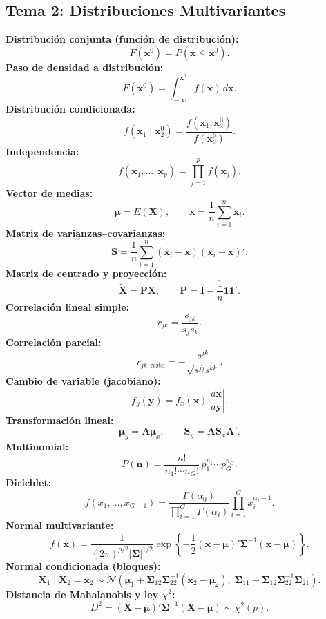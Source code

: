 \documentclass[12pt, a4paper]{article}
\theoremstyle{plain}
\theoremstyle{definition}
\theoremstyle{remark}
\newcommand{\mat}[1]{\mathbf{#1}}
\begin{document}
\subsection*{Tema 2: Distribuciones Multivariantes}
\begin{mdframed}[style=resultado]
\textbf{Distribución conjunta (función de distribución):}
\[
  F(\mathbf{x}^0)=P(\mathbf{x}\le \mathbf{x}^0).
\]
\textbf{Paso de densidad a distribución:}
\[
  F(\mathbf{x}^0)=\int_{-\infty}^{\mathbf{x}^0} f(\mathbf{x})\,d\mathbf{x}.
\]
\textbf{Distribución condicionada:}
\[
  f(\mathbf{x}_1\mid \mathbf{x}_2^0)=
  \frac{f(\mathbf{x}_1,\mathbf{x}_2^0)}{f(\mathbf{x}_2^0)}.
\]
\textbf{Independencia:}
\[
  f(\mathbf{x}_1,\dots,\mathbf{x}_p)=\prod_{j=1}^p f(\mathbf{x}_j).
\]
\textbf{Vector de medias:}
\[
  \boldsymbol{\mu}=E(\mathbf{X}),\qquad
  \bar{\mathbf{x}}=\frac{1}{n}\sum_{i=1}^n\mathbf{x}_i.
\]
\textbf{Matriz de varianzas--covarianzas:}
\[
  \mat{S}= \frac{1}{n}\sum_{i=1}^n (\mathbf{x}_i-\bar{\mathbf{x}})(\mathbf{x}_i-\bar{\mathbf{x}})'.
\]
\textbf{Matriz de centrado y proyección:}
\[
  \tilde{\mathbf{X}}=\mat{P}\mathbf{X},\qquad
  \mat{P}=\mat{I}-\frac{1}{n}\mathbf{1}\mathbf{1}'.
\]
\textbf{Correlación lineal simple:}
\[
  r_{jk}=\frac{s_{jk}}{s_js_k}.
\]
\textbf{Correlación parcial:}
\[
  r_{jk.\,\text{resto}}=-\frac{s^{jk}}{\sqrt{s^{jj}s^{kk}}}.
\]
\textbf{Cambio de variable (jacobiano):}
\[
  f_y(\mathbf{y})=f_x(\mathbf{x})\left|\frac{d\mathbf{x}}{d\mathbf{y}}\right|.
\]
\textbf{Transformación lineal:}
\[
  \boldsymbol{\mu}_y=\mat{A}\boldsymbol{\mu}_x,\qquad
  \mat{S}_y=\mat{A}\mat{S}_x\mat{A}'.
\]
\textbf{Multinomial:}
\[
  P(\mathbf{n})=\frac{n!}{n_1!\cdots n_G!}\,p_1^{n_1}\cdots p_G^{n_G}.
\]
\textbf{Dirichlet:}
\[
  f(x_1,\dots,x_{G-1})=
  \frac{\Gamma(\alpha_0)}{\prod_{i=1}^G\Gamma(\alpha_i)}
  \prod_{i=1}^G x_i^{\alpha_i-1}.
\]
\textbf{Normal multivariante:}
\[
  f(\mathbf{x})=\frac{1}{(2\pi)^{p/2}|\boldsymbol{\Sigma}|^{1/2}}
  \exp\!\left\{-\frac12(\mathbf{x}-\boldsymbol{\mu})'\boldsymbol{\Sigma}^{-1}(\mathbf{x}-\boldsymbol{\mu})\right\}.
\]
\textbf{Normal condicionada (bloques):}
\[
  \mathbf{X}_1\mid \mathbf{X}_2=\mathbf{x}_2 \sim
  \mathcal{N}\!\left(
  \boldsymbol{\mu}_1+\boldsymbol{\Sigma}_{12}\boldsymbol{\Sigma}_{22}^{-1}(\mathbf{x}_2-\boldsymbol{\mu}_2),\;
  \boldsymbol{\Sigma}_{11}-\boldsymbol{\Sigma}_{12}\boldsymbol{\Sigma}_{22}^{-1}\boldsymbol{\Sigma}_{21}
  \right).
\]
\textbf{Distancia de Mahalanobis y ley $\chi^2$:}
\[
  D^2=(\mathbf{X}-\boldsymbol{\mu})'\boldsymbol{\Sigma}^{-1}(\mathbf{X}-\boldsymbol{\mu})\sim\chi^2(p).
\]
\end{mdframed}
\end{document}
